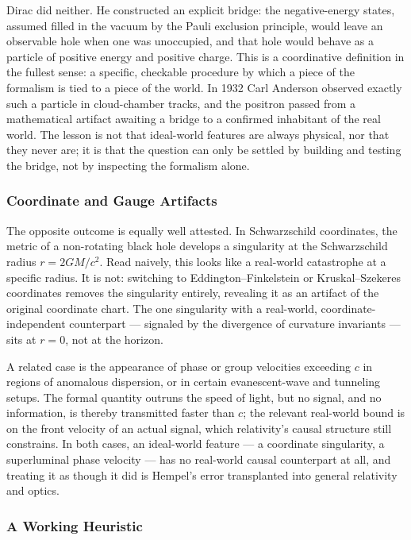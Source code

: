 Dirac did neither. He constructed an explicit bridge: the negative-energy
states, assumed filled in the vacuum by the Pauli exclusion principle, would
leave an observable hole when one was unoccupied, and that hole would behave as
a particle of positive energy and positive charge.
This is a coordinative definition in the fullest sense: a specific, checkable
procedure by which a piece of the formalism is tied to a piece of the world. In
1932 Carl Anderson observed exactly such a particle in cloud-chamber tracks,
and the positron passed from a mathematical artifact awaiting a bridge to a
confirmed inhabitant of the real world. The lesson is not that
ideal-world features are always physical, nor that they never are; it is that
the question can only be settled by building and testing the bridge, not by
inspecting the formalism alone.

\subsubsection{Coordinate and Gauge Artifacts}

The opposite outcome is equally well attested. In Schwarzschild coordinates,
the metric of a non-rotating black hole develops a singularity at the
Schwarzschild radius $r = 2GM/c^2$. Read naively, this looks like a real-world
catastrophe at a specific radius. It is not: switching to
Eddington--Finkelstein or Kruskal--Szekeres coordinates removes the singularity
entirely, revealing it as an artifact of the original coordinate chart. The one
singularity with a real-world, coordinate-independent counterpart --- signaled
by the divergence of curvature invariants --- sits at $r=0$, not at the
horizon.

A related case is the appearance of phase or group velocities exceeding $c$ in
regions of anomalous dispersion, or in certain evanescent-wave and tunneling
setups. The formal quantity outruns the speed of light, but no signal, and no
information, is thereby transmitted faster than $c$; the relevant real-world
bound is on the front velocity of an actual signal, which relativity's causal
structure still constrains. In both cases, an ideal-world feature --- a
coordinate singularity, a superluminal phase velocity --- has no real-world
causal counterpart at all, and treating it as though it did is Hempel's error
transplanted into general relativity and optics.

\subsubsection{A Working Heuristic}

